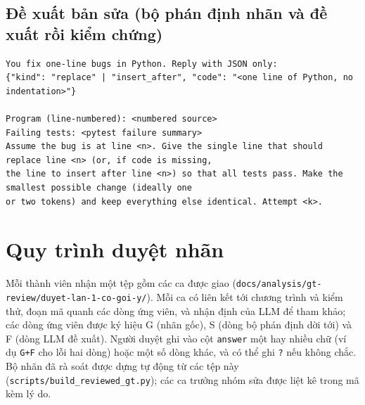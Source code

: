 \subsection{Đề xuất bản sửa (bộ phán định nhãn và đề xuất rồi kiểm chứng)}

\begin{lstlisting}[numbers=none]
You fix one-line bugs in Python. Reply with JSON only:
{"kind": "replace" | "insert_after", "code": "<one line of Python, no indentation>"}

Program (line-numbered): <numbered source>
Failing tests: <pytest failure summary>
Assume the bug is at line <n>. Give the single line that should replace line <n> (or, if code is missing,
the line to insert after line <n>) so that all tests pass. Make the smallest possible change (ideally one
or two tokens) and keep everything else identical. Attempt <k>.
\end{lstlisting}

\section{Quy trình duyệt nhãn}
\label{sec:quy-trinh-duyet}

Mỗi thành viên nhận một tệp gồm các ca được giao (\texttt{docs/analysis/gt-review/duyet-lan-1-co-goi-y/}). Mỗi ca có liên kết tới
chương trình và kiểm thử, đoạn mã quanh các dòng ứng viên, và nhận định của LLM để tham khảo; các dòng ứng viên được ký
hiệu G (nhãn gốc), S (dòng bộ phán định dời tới) và F (dòng LLM đề xuất). Người duyệt ghi vào cột \texttt{answer} một hay
nhiều chữ (ví dụ \texttt{G+F} cho lỗi hai dòng) hoặc một số dòng khác, và có thể ghi \texttt{?} nếu không chắc. Bộ nhãn
đã rà soát được dựng tự động từ các tệp này (\texttt{scripts/build\_reviewed\_gt.py}); các ca trưởng nhóm sửa được liệt
kê trong mã kèm lý do.
